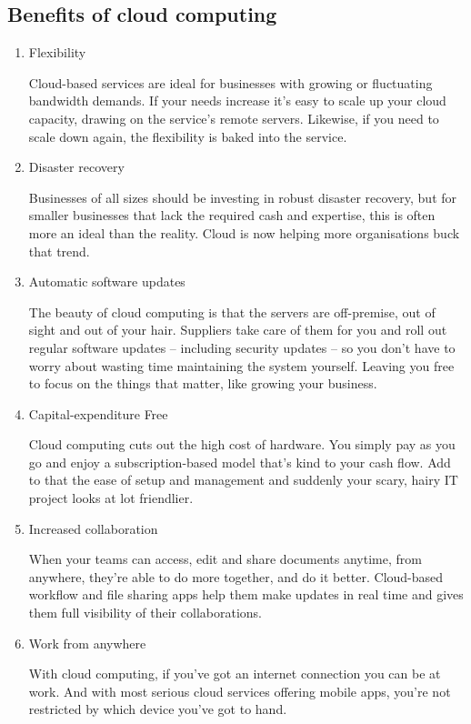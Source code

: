     \subsection{Benefits of cloud computing}
    \begin{enumerate}
    \item Flexibility
    \par Cloud-based services are ideal for businesses with growing or fluctuating bandwidth demands. If your needs increase it’s easy to scale up your cloud capacity, drawing on the service’s remote servers. Likewise, if you need to scale down again, the flexibility is baked into the service\cite{ben}. 
    
    \item Disaster recovery
    \par Businesses of all sizes should be investing in robust disaster recovery, but for smaller businesses that lack the required cash and expertise, this is often more an ideal than the reality. Cloud is now helping more organisations buck that trend\cite{ben}.
    
    \item Automatic software updates
    \par The beauty of cloud computing is that the servers are off-premise, out of sight and out of your hair. Suppliers take care of them for you and roll out regular software updates – including security updates – so you don’t have to worry about wasting time maintaining the system yourself. Leaving you free to focus on the things that matter, like growing your business\cite{ben}.
    
    \item Capital-expenditure Free
    \par Cloud computing cuts out the high cost of hardware. You simply pay as you go and enjoy a subscription-based model that’s kind to your cash flow. Add to that the ease of setup and management and suddenly your scary, hairy IT project looks at lot friendlier\cite{ben}. 
    
    \item Increased collaboration
    \par When your teams can access, edit and share documents anytime, from anywhere, they’re able to do more together, and do it better. Cloud-based workflow and file sharing apps help them make updates in real time and gives them full visibility of their collaborations\cite{ben}.
    
    \item Work from anywhere
    \par With cloud computing, if you’ve got an internet connection you can be at work. And with most serious cloud services offering mobile apps, you’re not restricted by which device you’ve got to hand\cite{ben}.
    

\end{enumerate}

